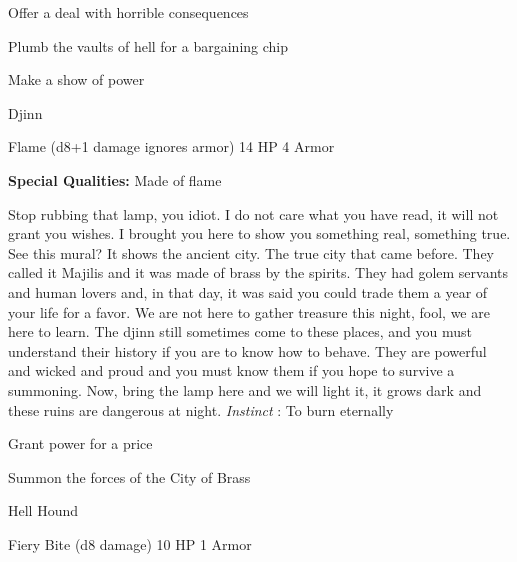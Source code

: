 \startitemize[1,packed]
         
\item Offer a deal with horrible consequences

         
\item Plumb the vaults of hell for a bargaining chip

         
\item Make a show of power

       
\stopitemize
       
\startMonsterName
Djinn	 
\stopMonsterName
       

Flame (d8+1 damage ignores armor)	14 HP	4 Armor

       


       
\startMonsterQualities
         {\bf Special Qualities:}  Made of flame
\stopMonsterQualities
       
\startMonsterDescription
Stop rubbing that lamp, you idiot. I do not care what you have read, it will not grant you wishes. I brought you here to show you something real, something true. See this mural? It shows the ancient city. The true city that came before. They called it Majilis and it was made of brass by the spirits. They had golem servants and human lovers and, in that day, it was said you could trade them a year of your life for a favor. We are not here to gather treasure this night, fool, we are here to learn. The djinn still sometimes come to these places, and you must understand their history if you are to know how to behave. They are powerful and wicked and proud and you must know them if you hope to survive a summoning. Now, bring the lamp here and we will light it, it grows dark and these ruins are dangerous at night. {\em Instinct} : To burn eternally
\stopMonsterDescription
       
\startitemize[1,packed]
         
\item Grant power for a price

         
\item Summon the forces of the City of Brass

       
\stopitemize
       
\startMonsterName
Hell Hound	 
\stopMonsterName
       

Fiery Bite (d8 damage)	10 HP	1 Armor

       

